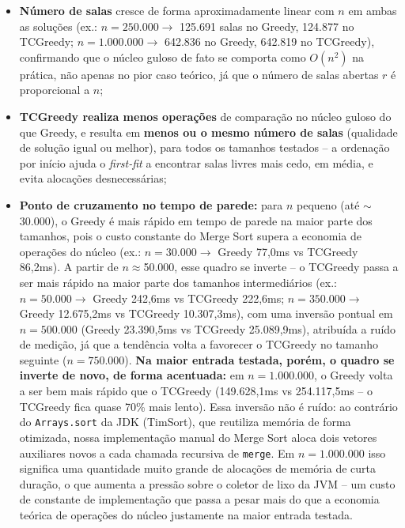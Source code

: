 \documentclass[12pt]{article}
\begin{document}
\begin{itemize}
\item \textbf{Número de salas} cresce de forma aproximadamente linear com
  $n$ em ambas as soluções (ex.: $n=250.000 \rightarrow$ 125.691 salas no
  Greedy, 124.877 no TCGreedy; $n=1.000.000 \rightarrow$ 642.836 no
  Greedy, 642.819 no TCGreedy), confirmando que o núcleo guloso de fato se
  comporta como $O(n^2)$ na prática, não apenas no pior caso teórico, já
  que o número de salas abertas $r$ é proporcional a $n$;
\item \textbf{TCGreedy realiza menos operações} de comparação no núcleo
  guloso do que Greedy, e resulta em \textbf{menos ou o mesmo número de
  salas} (qualidade de solução igual ou melhor), para todos os tamanhos
  testados -- a ordenação por início ajuda o \textit{first-fit} a
  encontrar salas livres mais cedo, em média, e evita alocações
  desnecessárias;
\item \textbf{Ponto de cruzamento no tempo de parede:} para $n$ pequeno
  (até $\sim$30.000), o Greedy é mais rápido em tempo de parede na maior
  parte dos tamanhos, pois o custo constante do Merge Sort supera a
  economia de operações do núcleo (ex.: $n=30.000 \rightarrow$ Greedy
  77,0ms vs TCGreedy 86,2ms). A partir de $n\approx$50.000, esse quadro se
  inverte -- o TCGreedy passa a ser mais rápido na maior parte dos
  tamanhos intermediários (ex.: $n=50.000 \rightarrow$ Greedy 242,6ms vs
  TCGreedy 222,6ms; $n=350.000 \rightarrow$ Greedy 12.675,2ms vs TCGreedy
  10.307,3ms), com uma inversão pontual em $n=500.000$ (Greedy 23.390,5ms
  vs TCGreedy 25.089,9ms), atribuída a ruído de medição, já que a
  tendência volta a favorecer o TCGreedy no tamanho seguinte
  ($n=750.000$). \textbf{Na maior entrada testada, porém, o quadro se
  inverte de novo, de forma acentuada:} em $n=1.000.000$, o Greedy volta
  a ser bem mais rápido que o TCGreedy (149.628,1ms vs 254.117,5ms -- o
  TCGreedy fica quase 70\% mais lento). Essa inversão não é ruído: ao
  contrário do \texttt{Arrays.sort} da JDK (TimSort), que reutiliza
  memória de forma otimizada, nossa implementação manual do Merge Sort
  aloca dois vetores auxiliares novos a cada chamada recursiva de
  \texttt{merge}. Em $n=1.000.000$ isso significa uma quantidade muito
  grande de alocações de memória de curta duração, o que aumenta a
  pressão sobre o coletor de lixo da JVM -- um custo de constante de
  implementação que passa a pesar mais do que a economia teórica de
  operações do núcleo justamente na maior entrada testada.
\end{itemize}
\end{document}
